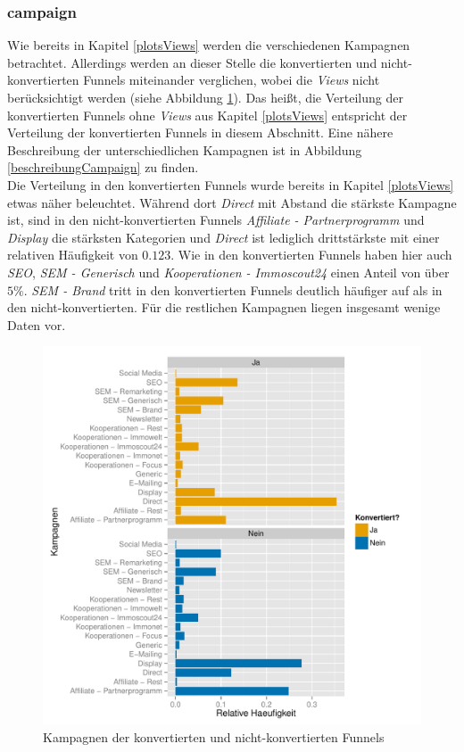 \subsubsection*{campaign}
Wie bereits in Kapitel \ref{plotsViews} werden die verschiedenen Kampagnen betrachtet. Allerdings werden an dieser Stelle die konvertierten und nicht-konvertierten Funnels miteinander verglichen, wobei die \textit{Views} nicht berücksichtigt werden (siehe Abbildung \ref{campaign}). Das heißt, die Verteilung der konvertierten Funnels ohne \textit{Views} aus Kapitel \ref{plotsViews} entspricht der Verteilung der konvertierten Funnels in diesem Abschnitt. Eine nähere Beschreibung der unterschiedlichen Kampagnen ist in Abbildung \ref{beschreibungCampaign} zu finden.\\
Die Verteilung in den konvertierten Funnels wurde bereits in Kapitel \ref{plotsViews} etwas näher beleuchtet. Während dort \textit{Direct} mit Abstand die stärkste Kampagne ist, sind in den nicht-konvertierten Funnels \textit{Affiliate - Partnerprogramm} und \textit{Display} die stärksten Kategorien und \textit{Direct} ist lediglich drittstärkste mit einer relativen Häufigkeit von $ 0.123 $. Wie in den konvertierten Funnels haben hier auch \textit{SEO}, \textit{SEM - Generisch} und \textit{Kooperationen - Immoscout24} einen Anteil von über $5 \%$. \textit{SEM - Brand} tritt in den konvertierten Funnels deutlich häufiger auf als in den nicht-konvertierten. Für die restlichen Kampagnen liegen insgesamt wenige Daten vor.

\begin{figure}[H]
	\centering
	\includegraphics[scale=0.5]{campaign.pdf}
	\caption{Kampagnen der konvertierten und nicht-konvertierten Funnels}
	\label{campaign}
\end{figure}
    
